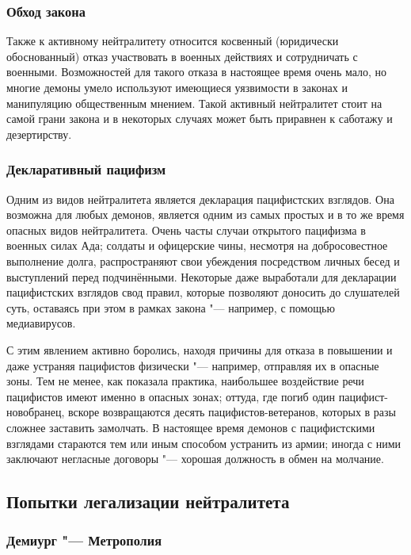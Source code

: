\subsubsection{Обход закона}

Также к активному нейтралитету относится косвенный (юридически обоснованный) отказ участвовать в военных действиях и сотрудничать с военными.
Возможностей для такого отказа в настоящее время очень мало, но многие демоны умело используют имеющиеся уязвимости в законах и манипуляцию общественным мнением.
Такой активный нейтралитет стоит на самой грани закона и в некоторых случаях может быть приравнен к саботажу и дезертирству.

\subsubsection{Декларативный пацифизм}

Одним из видов нейтралитета является декларация пацифистских взглядов.
Она возможна для любых демонов, является одним из самых простых и в то же время опасных видов нейтралитета.
Очень часты случаи открытого пацифизма в военных силах Ада;
солдаты и офицерские чины, несмотря на добросовестное выполнение долга, распространяют свои убеждения посредством личных бесед и выступлений перед подчинёнными.
Некоторые даже выработали для декларации пацифистских взглядов свод правил, которые позволяют доносить до слушателей суть, оставаясь при этом в рамках закона "--- например, с помощью медиавирусов.

С этим явлением активно боролись, находя причины для отказа в повышении и даже устраняя пацифистов физически "--- например, отправляя их в опасные зоны.
Тем не менее, как показала практика, наибольшее воздействие речи пацифистов имеют именно в опасных зонах;
оттуда, где погиб один пацифист-новобранец, вскоре возвращаются десять пацифистов-ветеранов, которых в разы сложнее заставить замолчать.
В настоящее время демонов с пацифистскими взглядами стараются тем или иным способом устранить из армии;
иногда с ними заключают негласные договоры "--- хорошая должность в обмен на молчание.

\subsection{Попытки легализации нейтралитета}

\subsubsection{Демиург "--- Метрополия}


